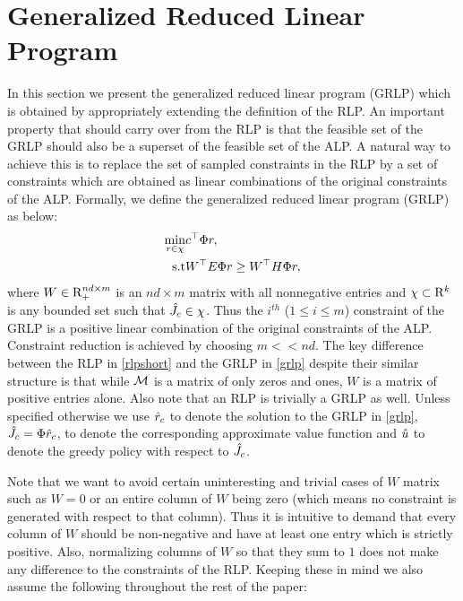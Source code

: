 \section{Generalized Reduced Linear Program}
In this section we present the generalized reduced linear program (GRLP) which is obtained by appropriately extending the definition of the RLP. An important property that should carry over from the RLP is that the feasible set of the GRLP should also be a superset of the feasible set of the ALP. A natural way to achieve this is to replace the set of sampled constraints in the RLP by a set of constraints which are obtained as linear combinations of the original constraints of the ALP. Formally, we define the generalized reduced linear program (GRLP) as below:
\begin{align}\label{grlp}
\min_{r\in \chi} &c^\top \Phi r,\nn\\
\text{s.t}\mb & W^\top E\Phi r\geq W^\top H \Phi r, 
\end{align}
where $W \in \mathrm{R}_+^{nd\times m}$ is an $nd\times m$ matrix with all nonnegative entries and $\chi \subset \mathrm{R}^k$ is any bounded set such that $\hat{J}_c \in \chi$. 
Thus the $i^{th}$ ($1\leq i\leq m$) constraint of the GRLP is a positive linear combination of the original constraints of the ALP. Constraint reduction is achieved by choosing $m<<nd$. The key difference between the RLP in \eqref{rlpshort} and the GRLP in \eqref{grlp} despite their similar structure is that while $\mathcal{M}$ is a matrix of only zeros and ones, $W$ is a matrix of positive entries alone. Also note that an RLP is trivially a GRLP as well. Unless specified otherwise we use $\hat{r}_c$ to denote the solution to the GRLP in \eqref{grlp}, $\hat{J}_c=\Phi \hat{r}_c$, to denote the corresponding approximate value function and $\hat{u}$ to denote the greedy policy with respect to $\hat{J}_c$.\par
Note that we want to avoid certain uninteresting and trivial cases of $W$ matrix such as $W=0$ or an entire column of $W$ being zero (which means no constraint is generated with respect to that column). Thus it is intuitive to demand that every column of $W$ should be non-negative and have at least one entry which is strictly positive. Also, normalizing columns of $W$ so that they sum to $1$ does not make any difference to the constraints of the RLP. Keeping these in mind we also assume the following throughout the rest of the paper:
